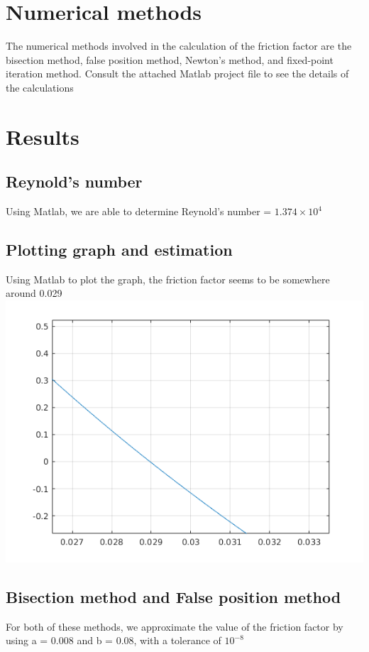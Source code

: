 \documentclass{article}
\begin{document}
	\section{Numerical methods}
	The numerical methods involved in the calculation of the friction factor are the bisection method, false position method, Newton's method, and fixed-point iteration method. Consult the attached Matlab project file to see the details of the calculations
	
	\section{Results}
	\subsection{Reynold's number}
    Using Matlab, we are able to determine Reynold's number = ${1.374 \times 10^4}$
    
    \subsection{Plotting graph and estimation}
    Using Matlab to plot the graph, the friction factor seems to be somewhere around 0.029 \\
    \includegraphics[scale=0.6]{untitled.png}
    
    \subsection{Bisection method and False position method}
    For both of these methods, we approximate the value of the friction factor by using a = 0.008 and b = 0.08, with a tolerance of ${10^{-8}}$
\end{document}
